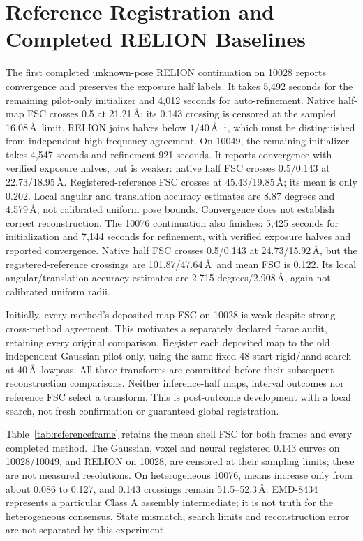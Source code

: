 \section{Reference Registration and Completed RELION Baselines}
\label{sec:referenceframe}
The first completed unknown-pose RELION continuation on 10028 reports
convergence and preserves the exposure half labels. It takes 5,492 seconds for
the remaining pilot-only initializer and 4,012 seconds for auto-refinement.
Native half-map FSC crosses 0.5 at 21.21\,\AA; its 0.143 crossing is censored at
the sampled 16.08\,\AA\ limit. RELION joins halves below $1/40$\,\AA$^{-1}$,
which must be distinguished from independent high-frequency agreement.
On 10049, the remaining initializer takes 4,547 seconds and refinement 921
seconds. It reports convergence with verified exposure halves, but is weaker:
native half FSC crosses 0.5/0.143 at 22.73/18.95\,\AA. Registered-reference
FSC crosses at 45.43/19.85\,\AA; its mean is only 0.202. Local angular and
translation accuracy estimates are 8.87 degrees and 4.579\,\AA, not calibrated
uniform pose bounds. Convergence does not establish correct reconstruction.
The 10076 continuation also finishes: 5,425 seconds for initialization and
7,144 seconds for refinement, with verified exposure halves and reported
convergence. Native half FSC crosses 0.5/0.143 at 24.73/15.92\,\AA, but the
registered-reference crossings are 101.87/47.64\,\AA\ and mean FSC is 0.122.
Its local angular/translation accuracy estimates are 2.715 degrees/2.908\,\AA,
again not calibrated uniform radii.

Initially, every method's deposited-map FSC on 10028 is weak despite strong
cross-method agreement. This motivates a separately declared frame audit,
retaining every original comparison. Register each deposited map to the old
independent Gaussian pilot only, using the same fixed 48-start rigid/hand search
at 40\,\AA\ lowpass. All three transforms are committed before their subsequent
reconstruction comparisons. Neither inference-half maps, interval outcomes nor
reference FSC select a transform. This is post-outcome development with a local
search, not fresh confirmation or guaranteed global registration.

Table~\ref{tab:referenceframe} retains the mean shell FSC for both frames
and every completed method. The Gaussian, voxel and neural registered 0.143 curves on 10028/10049,
and RELION on 10028, are censored at their sampling limits; these are not
measured resolutions. On heterogeneous
10076, means increase only from about 0.086 to 0.127, and 0.143 crossings remain
51.5--52.3\,\AA. EMD-8434 represents a particular Class A assembly intermediate;
it is not truth for the heterogeneous consensus. State mismatch, search limits
and reconstruction error are not separated by this experiment.


